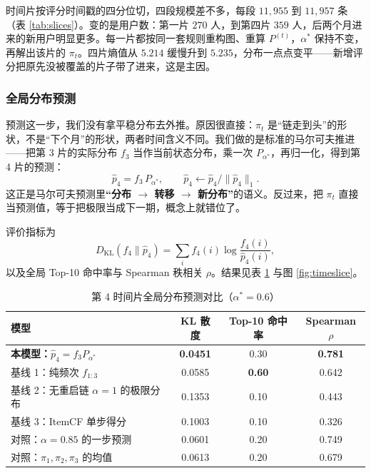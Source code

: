\documentclass[12pt,a4paper]{ctexart}
\begin{document}
时间片按评分时间戳的四分位切，四段规模差不多，每段 $11{,}955$ 到 $11{,}957$ 条（表 \ref{tab:slices}）。变的是用户数：第一片 $270$ 人，到第四片 $359$ 人，后两个月进来的新用户明显更多。每一片都按同一套规则重构图、重算 $P^{(t)}$，$\alpha^*$ 保持不变，再解出该片的 $\pi_t$。四片熵值从 $5.214$ 缓慢升到 $5.235$，分布一点点变平——新增评分把原先没被覆盖的片子带了进来，这是主因。

\subsubsection{全局分布预测}

预测这一步，我们没有拿平稳分布去外推。原因很直接：$\pi_t$ 是“链走到头”的形状，不是“下个月”的形状，两者时间含义不同。我们做的是标准的马尔可夫推进——把第 3 片的实际分布 $f_3$ 当作当前状态分布，乘一次 $P_{\alpha^*}$，再归一化，得到第 4 片的预测：
\begin{equation}
\hat p_4=f_3\,P_{\alpha^*},\qquad \hat p_4\leftarrow \hat p_4/\|\hat p_4\|_1 .
\label{eq:forecast}
\end{equation}
这正是马尔可夫预测里\textbf{“分布 $\to$ 转移 $\to$ 新分布”}的语义。反过来，把 $\pi_t$ 直接当预测值，等于把极限当成下一期，概念上就错位了。

评价指标为
\begin{equation}
D_{\mathrm{KL}}(f_4\|\hat p_4)=\sum_{i} f_4(i)\log\frac{f_4(i)}{\hat p_4(i)},
\label{eq:kl}
\end{equation}
以及全局 Top-10 命中率与 Spearman 秩相关 $\rho$。结果见表 \ref{tab:pred} 与图 \ref{fig:timeslice}。

\begin{table}[H]
\centering
\caption{第 4 时间片全局分布预测对比（$\alpha^*=0.6$）}
\label{tab:pred}
\small
\begin{tabular}{lccc}
\toprule
模型 & KL 散度 & Top-10 命中率 & Spearman $\rho$ \\
\midrule
\textbf{本模型：}$\hat p_4=f_3P_{\alpha^*}$ & \textbf{0.0451} & 0.30 & \textbf{0.781} \\
基线 1：纯频次 $f_{1:3}$ & 0.0585 & \textbf{0.60} & 0.642 \\
基线 2：无重启链 $\alpha=1$ 的极限分布 & 0.1353 & 0.10 & 0.443 \\
基线 3：ItemCF 单步得分 & 0.1003 & 0.10 & 0.326 \\
\midrule
对照：$\alpha=0.85$ 的一步预测 & 0.0601 & 0.20 & 0.749 \\
对照：$\pi_1,\pi_2,\pi_3$ 的均值 & 0.0613 & 0.20 & 0.679 \\
\bottomrule
\end{tabular}
\end{table}
\end{document}
